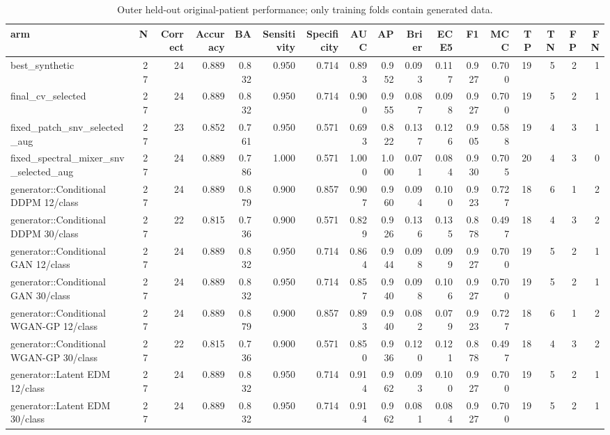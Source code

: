 \begin{table}[t]
\centering
\caption{Outer held-out original-patient performance; only training folds contain generated data.}
\footnotesize
\begin{tabular}{lrrrrrrrrrrrrrrrr}
\toprule
arm & N & Correct & Accuracy & BA & Sensitivity & Specificity & AUC & AP & Brier & ECE5 & F1 & MCC & TP & TN & FP & FN \\
\midrule
best\_synthetic & 27 & 24 & 0.889 & 0.832 & 0.950 & 0.714 & 0.893 & 0.952 & 0.093 & 0.117 & 0.927 & 0.700 & 19 & 5 & 2 & 1 \\
final\_cv\_selected & 27 & 24 & 0.889 & 0.832 & 0.950 & 0.714 & 0.900 & 0.955 & 0.087 & 0.098 & 0.927 & 0.700 & 19 & 5 & 2 & 1 \\
fixed\_patch\_snv\_selected\_aug & 27 & 23 & 0.852 & 0.761 & 0.950 & 0.571 & 0.693 & 0.822 & 0.137 & 0.126 & 0.905 & 0.588 & 19 & 4 & 3 & 1 \\
fixed\_spectral\_mixer\_snv\_selected\_aug & 27 & 24 & 0.889 & 0.786 & 1.000 & 0.571 & 1.000 & 1.000 & 0.071 & 0.084 & 0.930 & 0.705 & 20 & 4 & 3 & 0 \\
generator::Conditional DDPM 12/class & 27 & 24 & 0.889 & 0.879 & 0.900 & 0.857 & 0.907 & 0.960 & 0.094 & 0.100 & 0.923 & 0.727 & 18 & 6 & 1 & 2 \\
generator::Conditional DDPM 30/class & 27 & 22 & 0.815 & 0.736 & 0.900 & 0.571 & 0.829 & 0.926 & 0.136 & 0.135 & 0.878 & 0.497 & 18 & 4 & 3 & 2 \\
generator::Conditional GAN 12/class & 27 & 24 & 0.889 & 0.832 & 0.950 & 0.714 & 0.864 & 0.944 & 0.098 & 0.099 & 0.927 & 0.700 & 19 & 5 & 2 & 1 \\
generator::Conditional GAN 30/class & 27 & 24 & 0.889 & 0.832 & 0.950 & 0.714 & 0.857 & 0.940 & 0.098 & 0.106 & 0.927 & 0.700 & 19 & 5 & 2 & 1 \\
generator::Conditional WGAN-GP 12/class & 27 & 24 & 0.889 & 0.879 & 0.900 & 0.857 & 0.893 & 0.940 & 0.082 & 0.079 & 0.923 & 0.727 & 18 & 6 & 1 & 2 \\
generator::Conditional WGAN-GP 30/class & 27 & 22 & 0.815 & 0.736 & 0.900 & 0.571 & 0.850 & 0.936 & 0.120 & 0.121 & 0.878 & 0.497 & 18 & 4 & 3 & 2 \\
generator::Latent EDM 12/class & 27 & 24 & 0.889 & 0.832 & 0.950 & 0.714 & 0.914 & 0.962 & 0.093 & 0.100 & 0.927 & 0.700 & 19 & 5 & 2 & 1 \\
generator::Latent EDM 30/class & 27 & 24 & 0.889 & 0.832 & 0.950 & 0.714 & 0.914 & 0.962 & 0.081 & 0.084 & 0.927 & 0.700 & 19 & 5 & 2 & 1 \\

\end{tabular}
\end{table}
